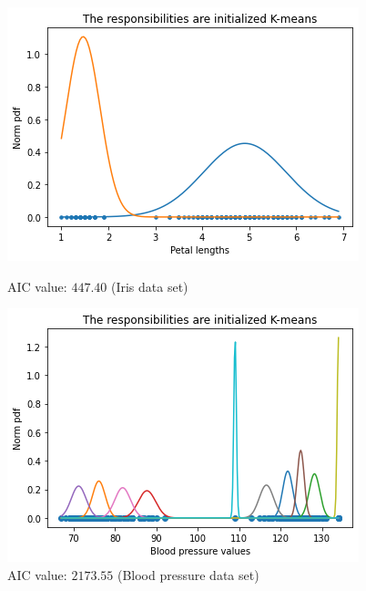 \documentclass[abstract=true]{scrartcl}
\begin{document}
\begin{figure}[H]
 	\begin{minipage}[t]{0.5\textwidth}
		\includegraphics[width=\textwidth]{images/kmeans_iris.png}
		\vspace{-20px}
 		\caption{AIC value: $447.40$ (Iris data set)}
	\end{minipage}
	\begin{minipage}[t]{0.5\textwidth}
 		\includegraphics[width=\textwidth]{images/kmeans_bdp.png}
 		\vspace{-20px}
 		\caption{AIC value: $2173.55$ (Blood pressure data set)}
	\end{minipage}
	\hspace{10px}
	\noindent{}
\end{figure}
\end{document}
